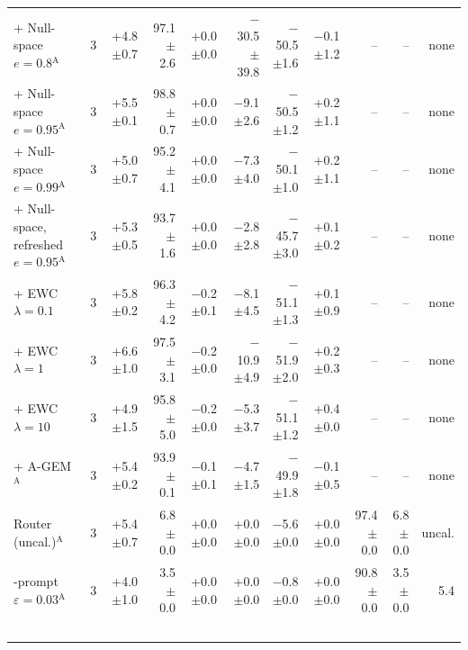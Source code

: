\begin{table}[t]
{\begin{tabular}{l c r rr rrr rr r}
+ Null-space $e{=}0.8$$^{\mathrm{A}}$ & 3 & +4.8{\scriptsize$\pm$0.7} & 97.1{\scriptsize$\pm$2.6} & +0.0{\scriptsize$\pm$0.0} & $-$30.5{\scriptsize$\pm$39.8} & $-$50.5{\scriptsize$\pm$1.6} & $-$0.1{\scriptsize$\pm$1.2} & -- & -- & none \\
+ Null-space $e{=}0.95$$^{\mathrm{A}}$ & 3 & +5.5{\scriptsize$\pm$0.1} & 98.8{\scriptsize$\pm$0.7} & +0.0{\scriptsize$\pm$0.0} & $-$9.1{\scriptsize$\pm$2.6} & $-$50.5{\scriptsize$\pm$1.2} & +0.2{\scriptsize$\pm$1.1} & -- & -- & none \\
+ Null-space $e{=}0.99$$^{\mathrm{A}}$ & 3 & +5.0{\scriptsize$\pm$0.7} & 95.2{\scriptsize$\pm$4.1} & +0.0{\scriptsize$\pm$0.0} & $-$7.3{\scriptsize$\pm$4.0} & $-$50.1{\scriptsize$\pm$1.0} & +0.2{\scriptsize$\pm$1.1} & -- & -- & none \\
+ Null-space, refreshed $e{=}0.95$$^{\mathrm{A}}$ & 3 & +5.3{\scriptsize$\pm$0.5} & 93.7{\scriptsize$\pm$1.6} & +0.0{\scriptsize$\pm$0.0} & $-$2.8{\scriptsize$\pm$2.8} & $-$45.7{\scriptsize$\pm$3.0} & +0.1{\scriptsize$\pm$0.2} & -- & -- & none \\
+ EWC $\lambda{=}0.1$ & 3 & +5.8{\scriptsize$\pm$0.2} & 96.3{\scriptsize$\pm$4.2} & $-$0.2{\scriptsize$\pm$0.1} & $-$8.1{\scriptsize$\pm$4.5} & $-$51.1{\scriptsize$\pm$1.3} & +0.1{\scriptsize$\pm$0.9} & -- & -- & none \\
+ EWC $\lambda{=}1$ & 3 & +6.6{\scriptsize$\pm$1.0} & 97.5{\scriptsize$\pm$3.1} & $-$0.2{\scriptsize$\pm$0.0} & $-$10.9{\scriptsize$\pm$4.9} & $-$51.9{\scriptsize$\pm$2.0} & +0.2{\scriptsize$\pm$0.3} & -- & -- & none \\
+ EWC $\lambda{=}10$ & 3 & +4.9{\scriptsize$\pm$1.5} & 95.8{\scriptsize$\pm$5.0} & $-$0.2{\scriptsize$\pm$0.0} & $-$5.3{\scriptsize$\pm$3.7} & $-$51.1{\scriptsize$\pm$1.2} & +0.4{\scriptsize$\pm$0.0} & -- & -- & none \\
+ A-GEM$^{\mathrm{A}}$ & 3 & +5.4{\scriptsize$\pm$0.2} & 93.9{\scriptsize$\pm$0.1} & $-$0.1{\scriptsize$\pm$0.1} & $-$4.7{\scriptsize$\pm$1.5} & $-$49.9{\scriptsize$\pm$1.8} & $-$0.1{\scriptsize$\pm$0.5} & -- & -- & none \\
\midrule
Router (uncal.)$^{\mathrm{A}}$ & 3 & +5.4{\scriptsize$\pm$0.7} & 6.8{\scriptsize$\pm$0.0} & +0.0{\scriptsize$\pm$0.0} & +0.0{\scriptsize$\pm$0.0} & $-$5.6{\scriptsize$\pm$0.0} & +0.0{\scriptsize$\pm$0.0} & 97.4{\scriptsize$\pm$0.0} & 6.8{\scriptsize$\pm$0.0} & uncal. \\
\method{}-prompt $\varepsilon{=}0.03$$^{\mathrm{A}}$ & 3 & +4.0{\scriptsize$\pm$1.0} & 3.5{\scriptsize$\pm$0.0} & +0.0{\scriptsize$\pm$0.0} & +0.0{\scriptsize$\pm$0.0} & $-$0.8{\scriptsize$\pm$0.0} & +0.0{\scriptsize$\pm$0.0} & 90.8{\scriptsize$\pm$0.0} & 3.5{\scriptsize$\pm$0.0} & 5.4 \\
$$
\end{tabular}}
\end{table}
